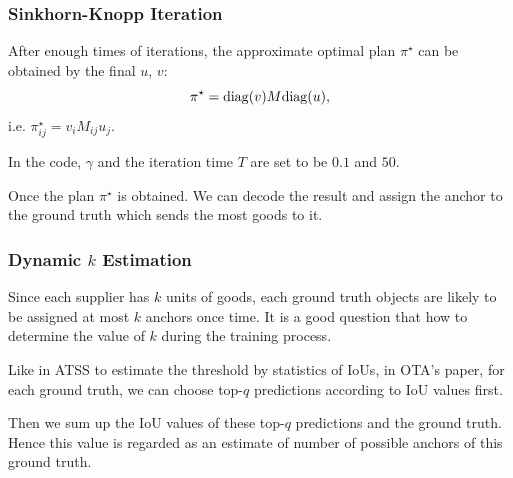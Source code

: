 \documentclass[slidetop, mathserif, dvipsnames]{beamer}
\begin{document}
\begin{frame}
    \frametitle{Sinkhorn-Knopp Iteration}

    After enough times of iterations,
    the approximate optimal plan $\pi^\star$
    can be obtained by the final $u$, $v$:
    \[
        \pi^\star = {\rm diag}(v) M {\rm diag}(u),
    \]
    i.e. $\pi_{ij}^\star = v_iM_{ij}u_j$.

    \quad

    In the code, $\gamma$ and the iteration time $T$ are set to be $0.1$ and $50$.

    \quad 

    Once the plan $\pi^\star$ is obtained. We can decode the result and
    assign the anchor to the ground truth which sends the most goods to it.
\end{frame}

\begin{frame}
    \frametitle{Dynamic $k$ Estimation}

    Since each supplier has $k$ units of goods, each ground truth objects are
    likely to be assigned at most $k$ anchors once time.
    It is a good question that how to determine the value of $k$ during the 
    training process.

    \quad

    Like in ATSS to estimate the threshold by statistics of IoUs,
    in OTA's paper, for each ground truth, we can choose top-$q$ predictions
    according to IoU values first.

    \quad 

    Then we sum up the IoU values of these top-$q$ predictions and the ground
    truth. Hence this value is regarded as an estimate of number of possible
    anchors of this ground truth.

\end{frame}
\end{document}
